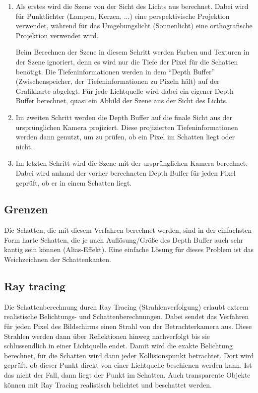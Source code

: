 \begin{enumerate}
 \item Als erstes wird die Szene von der Sicht des Lichts aus berechnet. Dabei wird für Punktlichter
       (Lampen, Kerzen, ...) eine perspektivische Projektion verwendet, während für das Umgebungslicht
       (Sonnenlicht) eine orthografische Projektion verwendet wird.

       Beim Berechnen der Szene in diesem Schritt werden Farben und Texturen in der Szene ignoriert,
       denn es wird nur die Tiefe der Pixel für die Schatten benötigt. Die Tiefeninformationen werden
       in dem "`Depth Buffer"' (Zwischenspeicher, der Tiefeninformationen zu Pixeln hält) auf
       der Grafikkarte abgelegt. Für jede Lichtquelle wird dabei ein eigener Depth Buffer berechnet,
       quasi ein Abbild der Szene aus der Sicht des Lichts.
 \item Im zweiten Schritt werden die Depth Buffer auf die finale Sicht aus der ursprünglichen Kamera
       projiziert. Diese projizierten Tiefeninformationen werden dann genutzt, um zu prüfen, ob ein
       Pixel im Schatten liegt oder nicht.
 \item Im letzten Schritt wird die Szene mit der ursprünglichen Kamera berechnet. Dabei wird anhand
       der vorher berechneten Depth Buffer für jeden Pixel geprüft, ob er in einem Schatten liegt.
\end{enumerate}

\cite{shadowvol2014}

\subsection*{Grenzen}

Die Schatten, die mit diesem Verfahren berechnet werden, sind in der einfachsten Form harte Schatten,
die je nach Auflösung/Größe des Depth Buffer auch sehr kantig sein können (Alias-Effekt). Eine
einfache Lösung für dieses Problem ist das Weichzeichnen der Schattenkanten.

\subsection{Ray tracing}

Die Schattenberechnung durch Ray Tracing (Strahlenverfolgung) erlaubt extrem realistische Belichtungs-
und Schattenberechnungen.
Dabei sendet das Verfahren für jeden Pixel des Bildschirms einen Strahl von der Betrachterkamera aus.
Diese Strahlen werden dann über Reflektionen hinweg nachverfolgt bis sie schlussendlich in einer
Lichtquelle endet. Damit wird die exakte Belichtung berechnet, für die Schatten wird dann jeder
Kollisionspunkt betrachtet. Dort wird geprüft, ob dieser Punkt direkt von einer Lichtquelle
beschienen werden kann. Ist das nicht der Fall, dann liegt der Punkt im Schatten. Auch transparente
Objekte können mit Ray Tracing realistisch belichtet und beschattet werden. \cite{raytracing2014}

